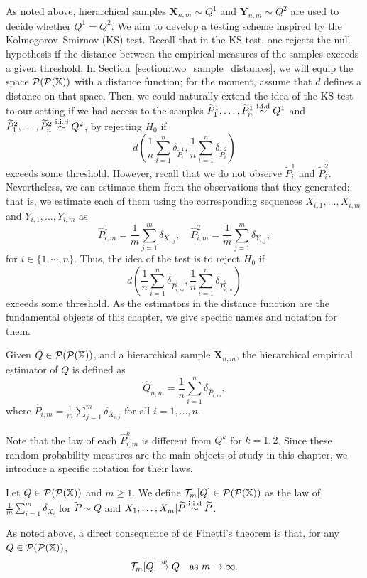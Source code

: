 As noted above, hierarchical samples $\mathbf{X}_{n,m} \sim Q^1$ and $\mathbf{Y}_{n,m} \sim Q^2$ are used to decide whether $Q^1 = Q^2$. We aim to develop a testing scheme inspired by the Kolmogorov--Smirnov (KS) test. Recall that in the KS test, one rejects the null hypothesis if the distance between the empirical measures of the samples exceeds a given threshold. In Section~\ref{section:two_sample_distances}, we will equip the space $\mathcal{P}(\mathcal{P}(\mathbb{X}))$ with a distance function; for the moment, assume that $d$ defines a distance on that space. Then, we could naturally extend the idea of the KS test to our setting if we had access to the samples $\widetilde{P}^1_1, \dots, \widetilde{P}^1_n \overset{\mathrm{i.i.d}}{\sim} Q^1$ and $\widetilde{P}^2_1, \dots, \widetilde{P}^2_n \overset{\mathrm{i.i.d}}{\sim} Q^2$, by rejecting $H_0$ if 
\[
d\left( \frac{1}{n}\sum_{i=1}^n \delta_{\widetilde{P}^1_i}, \frac{1}{n}\sum_{i=1}^n \delta_{\widetilde{P}^2_i}\right)
\]
exceeds some threshold. However, recall that we do not observe $\widetilde{P}^1_i$ and $\widetilde{P}^2_i$. Nevertheless, we can estimate them from the observations that they generated; that is, we estimate each of them using the corresponding sequences $X_{i,1}, \dots, X_{i,m}$ and $Y_{i,1}, \dots, Y_{i,m}$ as
\[
\widehat{P}^1_{i,m} = \frac{1}{m}\sum_{j=1}^m \delta_{X_{i,j}}, \quad \widehat{P}^2_{i,m} = \frac{1}{m}\sum_{j=1}^m \delta_{Y_{i,j}}, 
\]
for $i \in \{1,\cdots, n \}.$ Thus, the idea of the test is to reject $H_0$ if 
\[
d\left( \frac{1}{n}\sum_{i=1}^n \delta_{\widehat{P}^1_{i,m}}, \frac{1}{n}\sum_{i=1}^n \delta_{\widehat{P}^2_{i,m}}\right)
\]
exceeds some threshold. As the estimators in the distance function are the fundamental objects of this chapter, we give specific names and notation for them.
\begin{definition}
    \label{definition:hier_emp_estimator}
    Given $Q \in \mathcal{P}(\mathcal{P}(\mathbb{X}))$, and a hierarchical sample $\mathbf{X}_{n,m}$, the hierarchical empirical estimator of $Q$ is defined as 
    \[
    \widehat{Q}_{n,m} = \frac{1}{n}\sum_{i = 1}^n \delta_{\widehat{P}_{i,m}},
    \]
    where $\widehat{P}_{i,m} = \frac{1}{m}\sum_{j = 1}^m \delta_{X_{i,j}}$ for all $i = 1, \dots, n$.
\end{definition}

Note that the law of each $\widehat{P}^k_{i,m}$ is different from $Q^k$ for $k = 1,2$. Since these random probability measures are the main objects of study in this chapter, we introduce a specific notation for their laws. 

\begin{definition}\label{definition:tau_m}
    Let $Q \in \mathcal{P}(\mathcal{P}(\mathbb{X}))$ and $m \geq 1$. We define $\mathcal{T}_m[Q] \in \mathcal{P}(\mathcal{P}(\mathbb{X}))$ as the law of $\frac{1}{m} \sum_{i=1}^m \delta_{X_i}$ for $\widetilde{P} \sim Q$ and $X_1, \dots, X_m | \widetilde{P} \overset{\mathrm{i.i.d}}{\sim} \widetilde{P}$.
\end{definition}
As noted above, a direct consequence of de Finetti's theorem is that, for any $Q \in \mathcal{P}(\mathcal{P}(\mathbb{X}))$,
\begin{equation*}
\mathcal{T}_m[Q] \overset{w}{\to} Q \quad \text{as } m \to \infty.
\end{equation*}


